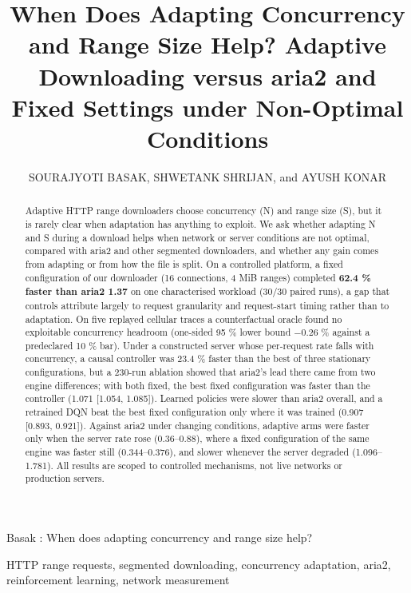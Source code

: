 \documentclass{ieeeaccess}
\begin{document}
\title{When Does Adapting Concurrency and Range Size Help? Adaptive Downloading versus aria2 and Fixed Settings under Non-Optimal Conditions}
\author{\uppercase{Sourajyoti Basak},
\uppercase{Shwetank Shrijan}, and
\uppercase{Ayush Konar}}
\address[1]{Vellore Institute of Technology, Vellore, Tamil Nadu, India - 632014 (Computer Networks Lab, BCSE308P). Emails: sourajyoti.basak2024@vitstudent.ac.in, shwetank.shrijan2024@vitstudent.ac.in, ayush.konar2024@vitstudent.ac.in}
{Basak \headeretal: When does adapting concurrency and range size help?}

\begin{abstract}Adaptive HTTP range downloaders choose concurrency (N) and range size (S), but it is rarely clear when adaptation has anything to exploit. We ask whether adapting N and S during a download helps when network or server conditions are not optimal, compared with aria2 and other segmented downloaders, and whether any gain comes from adapting or from how the file is split. On a controlled platform, a fixed configuration of our downloader (16 connections, 4 MiB ranges) completed \textbf{62.4 \% faster than aria2 1.37} on one characterised workload (30/30 paired runs), a gap that controls attribute largely to request granularity and request-start timing rather than to adaptation. On five replayed cellular traces a counterfactual oracle found no exploitable concurrency headroom (one-sided 95 \% lower bound −0.26 \% against a predeclared 10 \% bar). Under a constructed server whose per-request rate falls with concurrency, a causal controller was 23.4 \% faster than the best of three stationary configurations, but a 230-run ablation showed that aria2's lead there came from two engine differences; with both fixed, the best fixed configuration was faster than the controller (1.071 [1.054, 1.085]). Learned policies were slower than aria2 overall, and a retrained DQN beat the best fixed configuration only where it was trained (0.907 [0.893, 0.921]). Against aria2 under changing conditions, adaptive arms were faster only when the server rate rose (0.36–0.88), where a fixed configuration of the same engine was faster still (0.344–0.376), and slower whenever the server degraded (1.096–1.781). All results are scoped to controlled mechanisms, not live networks or production servers.\end{abstract}
\begin{keywords}HTTP range requests, segmented downloading, concurrency adaptation, aria2, reinforcement learning, network measurement\end{keywords}
\titlepgskip=-15pt
\maketitle
\end{document}
